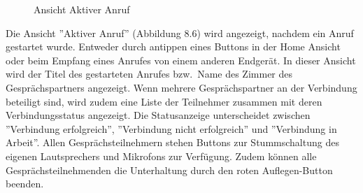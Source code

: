 \begin{figure}[h]
\begin{minipage}[b]{0.45\textwidth}
        \caption{Ansicht Aktiver Anruf}
    \end{minipage}
    \label{fig:MobileClient-Screens3}
\end{figure}

Die Ansicht ''Aktiver Anruf'' (Abbildung 8.6) wird angezeigt, nachdem ein Anruf gestartet wurde.
Entweder durch antippen eines Buttons in der Home Ansicht oder beim Empfang eines Anrufes von einem anderen Endgerät.
In dieser Ansicht wird der Titel des gestarteten Anrufes bzw.\ Name des Zimmer des Gesprächspartners angezeigt.
Wenn mehrere Gesprächspartner an der Verbindung beteiligt sind, wird zudem eine Liste der Teilnehmer zusammen mit deren Verbindungsstatus angezeigt.
Die Statusanzeige unterscheidet zwischen ''Verbindung erfolgreich'', ''Verbindung nicht erfolgreich'' und ''Verbindung in Arbeit''.
Allen Gesprächsteilnehmern stehen Buttons zur Stummschaltung des eigenen Lautsprechers und Mikrofons zur Verfügung.
Zudem können alle Gesprächsteilnehmenden die Unterhaltung durch den roten Auflegen-Button beenden.

